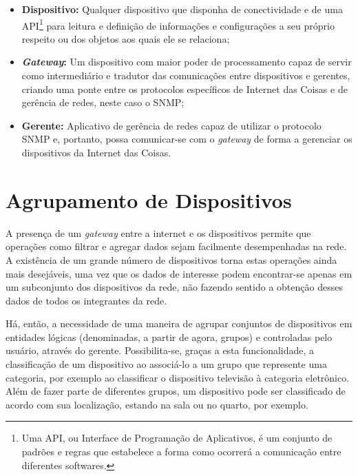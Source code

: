 \documentclass[twoside,english,brazilian]{UNISINOSmonografia}
\begin{document}
\begin{itemize}

	\item \textbf{Dispositivo:}
Qualquer dispositivo que disponha de conectividade e de uma API\footnote{
	Uma API, ou Interface de Programação de Aplicativos, é um conjunto de 
	padrões e regras que estabelece a forma como ocorrerá a comunicação entre 
	diferentes softwares.
} para leitura e definição de informações e configurações a seu próprio 
respeito ou dos objetos aos quais ele se relaciona;

	\item \textbf{\textit{Gateway}:}
Um dispositivo com maior poder de processamento capaz de servir como 
intermediário e tradutor das comunicações entre dispositivos e gerentes, 
criando uma ponte entre os protocolos específicos de Internet das Coisas e de 
gerência de redes, neste caso o SNMP;


	\item \textbf{Gerente:}
Aplicativo de gerência de redes capaz de utilizar o protocolo SNMP e, 
portanto, possa comunicar-se com o \textit{gateway} de forma a gerenciar os 
dispositivos da Internet das Coisas.

\end{itemize}


\section{Agrupamento de Dispositivos}

A presença de um \textit{gateway} entre a internet e os dispositivos permite 
que operações como filtrar e agregar dados sejam facilmente desempenhadas na 
rede.
A existência de um grande número de dispositivos torna estas operações ainda 
mais desejáveis, uma vez que os dados de interesse podem encontrar-se apenas 
em um subconjunto dos dispositivos da rede, não fazendo sentido a obtenção 
desses dados de todos os integrantes da rede.


Há, então, a necessidade de uma maneira de agrupar conjuntos de dispositivos 
em entidades lógicas (denominadas, a partir de agora, grupos) e controladas 
pelo usuário, através do gerente.
Possibilita-se, graças a esta funcionalidade, a classificação de um 
dispositivo ao associá-lo a um grupo que represente uma categoria, por exemplo 
ao classificar o dispositivo televisão à categoria eletrônico.
Além de fazer parte de diferentes grupos, um dispositivo pode ser 
classificado de acordo com sua localização, estando na sala ou no quarto, por 
exemplo.
\end{document}
